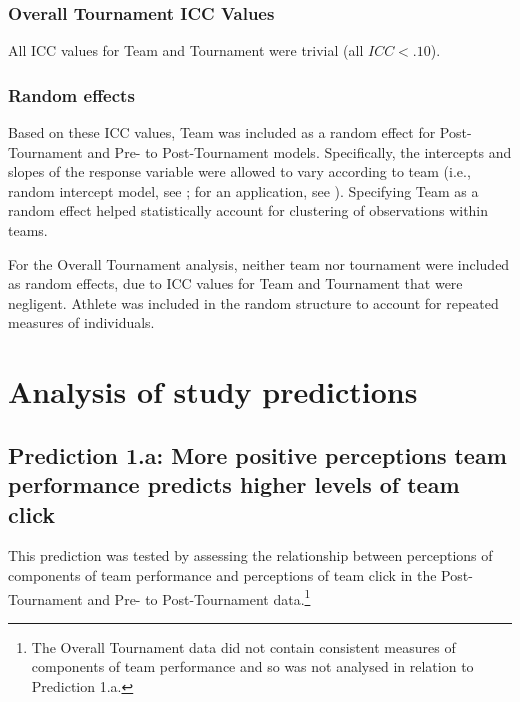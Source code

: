 \begin{CJK}{UTF8}{gbsn}
\subsubsection{Overall Tournament ICC Values}
All ICC values for Team and Tournament were trivial (all $ICC < .10$).

\subsubsection{Random effects}
Based on these ICC values, Team was included as a random effect for Post-Tournament and Pre- to Post-Tournament models.
Specifically, the intercepts and slopes of the response variable were allowed to vary according to team (i.e., random intercept model, see \textcite{Pinheiro2000}; for an application, see \textcite{Oberauer2006}).
Specifying Team as a random effect helped statistically account for clustering of observations within teams.

For the Overall Tournament analysis, neither team nor tournament were included as random effects, due to ICC values for Team and Tournament that were negligent.  Athlete was included in the random structure to account for repeated measures of individuals.















\clearpage




\section{Analysis of study predictions}




\subsection{Prediction 1.a: More positive perceptions team performance predicts higher levels of team click\label{sect:prediction1a}}

This prediction was tested by assessing the relationship between perceptions of components of team performance and perceptions of team click in the Post-Tournament and Pre- to Post-Tournament data.\footnote{The Overall Tournament data did not contain consistent measures of components of team performance and so was not analysed in relation to Prediction 1.a.}


\end{CJK}
